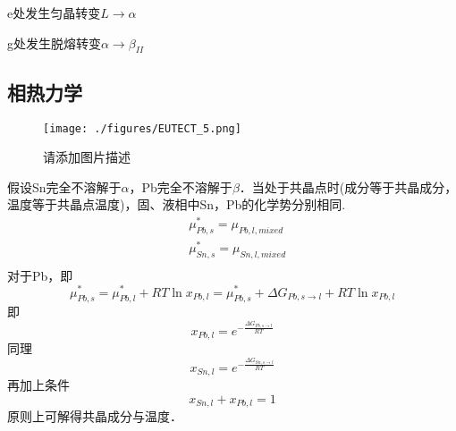 e处发生匀晶转变$L \rightarrow \alpha$

g处发生脱熔转变$\alpha \rightarrow \beta_{II}$

\subsection{相热力学}
\begin{figure}[ht]
\centering
\texttt{[image: ./figures/EUTECT\_5.png]}
\caption{请添加图片描述} \label{EUTECT_fig5}
\end{figure}
假设Sn完全不溶解于$\alpha$，Pb完全不溶解于$\beta$．当处于共晶点时(成分等于共晶成分，温度等于共晶点温度)，固、液相中Sn，Pb的化学势分别相同.
\begin{align}
&\mu_{Pb,s}^*=\mu_{Pb,l,mixed}\\
&\mu_{Sn,s}^*=\mu_{Sn,l,mixed}\\
\end{align}
对于Pb，即
$$\mu_{Pb,s}^*=\mu_{Pb,l}^*+RT \ln x_{Pb,l}=\mu_{Pb,s}^*+\Delta G_{Pb, s\rightarrow l}+RT \ln x_{Pb,l}$$
即
\begin{equation}
x_{Pb,l}=e^{-\frac{\Delta G_{Pb, s\rightarrow l}}{RT}}
\end{equation}
同理
\begin{equation}
x_{Sn,l}=e^{-\frac{\Delta G_{Sn, s\rightarrow l}}{RT}}
\end{equation}
再加上条件
\begin{equation}
x_{Sn,l}+x_{Pb,l}=1
\end{equation}
原则上可解得共晶成分与温度．
